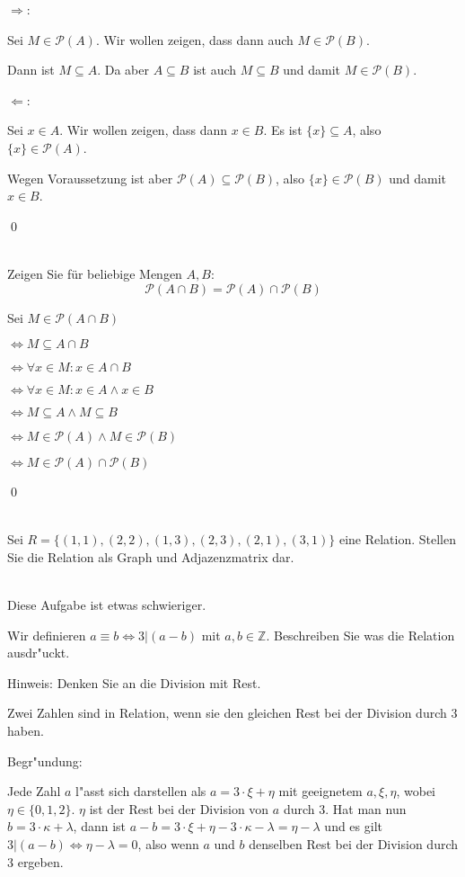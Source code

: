\begin{loesung}
  \glqq$\Rightarrow$\grqq:

  Sei $M\in\mathscr{P}(A)$. Wir wollen zeigen, dass dann auch $M\in\mathscr{P}(B)$.
  
  Dann ist $M\subseteq A$. Da aber $A\subseteq B$ ist auch $M\subseteq B$ und damit $M\in\mathscr{P}(B)$.

  \glqq$\Leftarrow$\grqq:

  Sei $x\in A$. Wir wollen zeigen, dass dann $x\in B$. Es ist $\{x\}\subseteq A$, also $\{x\}\in\mathscr{P}(A)$.
  
  Wegen Voraussetzung ist aber $\mathscr{P}(A)\subseteq\mathscr{P}(B)$, also $\{x\}\in\mathscr{P}(B)$ und damit $x\in B$. 

  \qed
\end{loesung}

\\
Zeigen Sie für beliebige Mengen $A,B$:
\[\mathscr{P}(A\cap B)=\mathscr{P}(A)\cap\mathscr{P}(B)\]

\begin{loesung}
Sei $M\in\mathscr{P}(A\cap B)$

$\Leftrightarrow M\subseteq A\cap B$

$\Leftrightarrow \forall x\in M:x\in A\cap B$

$\Leftrightarrow \forall x\in M: x\in A\wedge x\in B$

$\Leftrightarrow M\subseteq A\wedge M\subseteq B$

$\Leftrightarrow M\in\mathscr{P}(A)\wedge M\in\mathscr{P}(B)$

$\Leftrightarrow M\in\mathscr{P}(A)\cap\mathscr{P}(B)$

\qed
\end{loesung}

\\
Sei $R=\{(1,1),(2,2),(1,3),(2,3),(2,1),(3,1)\}$ eine Relation. Stellen Sie die Relation als Graph und Adjazenzmatrix dar.

\\
Diese Aufgabe ist etwas schwieriger.

Wir definieren $a\equiv b\Leftrightarrow 3|(a-b)$ mit $a,b\in\mathbb{Z}$. Beschreiben Sie was die Relation ausdr"uckt.

\begin{notes}
Hinweis: Denken Sie an die Division mit Rest.
\end{notes}

\begin{loesung}
 Zwei Zahlen sind in Relation, wenn sie den gleichen Rest bei der Division durch $3$ haben. 
 
 Begr"undung:

 Jede Zahl $a$ l"asst sich darstellen als $a=3\cdot \xi+\eta$ mit geeignetem $a,\xi,\eta$, wobei $\eta\in\{0,1,2\}$.
 $\eta$ ist der Rest bei der Division von $a$ durch $3$. Hat man nun $b=3\cdot\kappa+\lambda$, dann ist 
 $a-b=3\cdot\xi+\eta-3\cdot\kappa-\lambda=\eta-\lambda$ und es gilt $3|(a-b)\Leftrightarrow \eta-\lambda=0$, also wenn $a$ und $b$ denselben Rest bei der Division durch $3$ ergeben.
\end{loesung}

